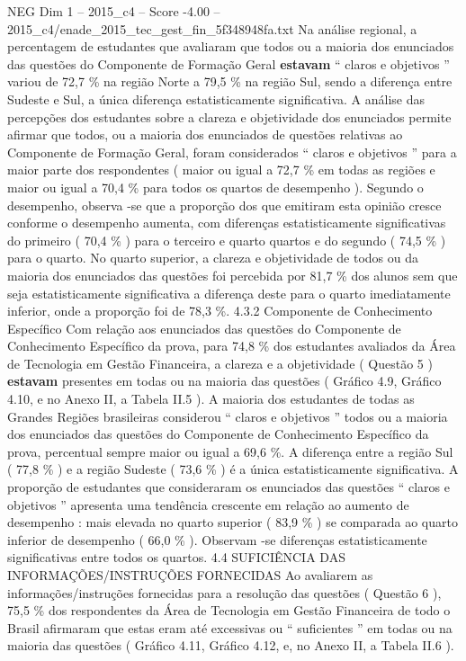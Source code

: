 \begin{textsample}{NEG Dim 1 – 2015\_c4 – Score -4.00 – 2015\_c4/enade\_2015\_tec\_gest\_fin\_5f348948fa.txt}
Na análise regional, a percentagem de estudantes que avaliaram que todos ou a maioria dos enunciados das questões do Componente de Formação Geral \textbf{estavam} “ claros e objetivos ” variou de 72,7 \% na região Norte a 79,5 \% na região Sul, sendo a diferença entre Sudeste e Sul, a única diferença estatisticamente significativa.
A análise das percepções dos estudantes sobre a clareza e objetividade dos enunciados permite afirmar que todos, ou a maioria dos enunciados de questões relativas ao Componente de Formação Geral, foram considerados “ claros e objetivos ” para a maior parte dos respondentes ( maior ou igual a 72,7 \% em todas as regiões e maior ou igual a 70,4 \% para todos os quartos de desempenho ).
Segundo o desempenho, observa -se que a proporção dos que emitiram esta opinião cresce conforme o desempenho aumenta, com diferenças estatisticamente significativas do primeiro ( 70,4 \% ) para o terceiro e quarto quartos e do segundo ( 74,5 \% ) para o quarto.
No quarto superior, a clareza e objetividade de todos ou da maioria dos enunciados das questões foi percebida por 81,7 \% dos alunos sem que seja estatisticamente significativa a diferença deste para o quarto imediatamente inferior, onde a proporção foi de 78,3 \%. 4.3.2 Componente de Conhecimento Específico Com relação aos enunciados das questões do Componente de Conhecimento Específico da prova, para 74,8 \% dos estudantes avaliados da Área de Tecnologia em Gestão Financeira, a clareza e a objetividade ( Questão 5 ) \textbf{estavam} presentes em todas ou na maioria das questões ( Gráfico 4.9, Gráfico 4.10, e no Anexo II, a Tabela II.5 ).
A maioria dos estudantes de todas as Grandes Regiões brasileiras considerou “ claros e objetivos ” todos ou a maioria dos enunciados das questões do Componente de Conhecimento Específico da prova, percentual sempre maior ou igual a 69,6 \%.
A diferença entre a região Sul ( 77,8 \% ) e a região Sudeste ( 73,6 \% ) é a única estatisticamente significativa.
A proporção de estudantes que consideraram os enunciados das questões “ claros e objetivos ” apresenta uma tendência crescente em relação ao aumento de desempenho : mais elevada no quarto superior ( 83,9 \% ) se comparada ao quarto inferior de desempenho ( 66,0 \% ).
Observam -se diferenças estatisticamente significativas entre todos os quartos. 4.4 SUFICIÊNCIA DAS INFORMAÇÕES/INSTRUÇÕES FORNECIDAS Ao avaliarem as informações/instruções fornecidas para a resolução das questões ( Questão 6 ), 75,5 \% dos respondentes da Área de Tecnologia em Gestão Financeira de todo o Brasil afirmaram que estas eram até excessivas ou “ suficientes ” em todas ou na maioria das questões ( Gráfico 4.11, Gráfico 4.12, e, no Anexo II, a Tabela II.6 ).

\end{textsample}
